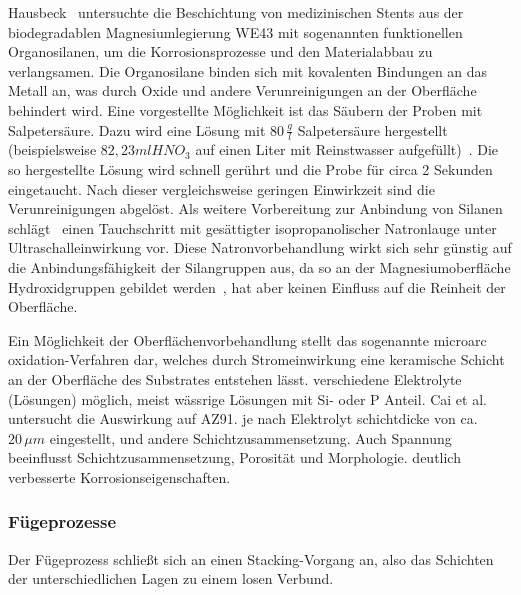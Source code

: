 Hausbeck~\cite{Hausbeck2012} untersuchte die Beschichtung von medizinischen Stents aus der biodegradablen Magnesiumlegierung WE43 mit sogenannten funktionellen Organosilanen, um die Korrosionsprozesse und den Materialabbau zu verlangsamen.
Die Organosilane binden sich mit kovalenten Bindungen an das Metall an, was durch Oxide und andere Verunreinigungen an der Oberfläche behindert wird.
Eine vorgestellte Möglichkeit ist das Säubern der Proben mit Salpetersäure.
Dazu wird eine Lösung mit $80\, \frac{g}{l}$ Salpetersäure hergestellt (beispielsweise $82,23 ml HNO_3$ auf einen Liter mit Reinstwasser aufgefüllt)~.
Die so hergestellte Lösung wird schnell gerührt und die Probe für circa 2 Sekunden eingetaucht.
Nach dieser vergleichsweise geringen Einwirkzeit sind die Verunreinigungen abgelöst.
Als weitere Vorbereitung zur Anbindung von Silanen schlägt~\cite{Hausbeck2012} einen Tauchschritt mit gesättigter isopropanolischer Natronlauge unter Ultraschalleinwirkung vor.
Diese Natronvorbehandlung wirkt sich sehr günstig auf die Anbindungsfähigkeit der Silangruppen aus, da so an der Magnesiumoberfläche Hydroxidgruppen gebildet werden~\cite{Hausbeck2012,Goubaidoulline2004}, hat aber keinen Einfluss auf die Reinheit der Oberfläche.

Ein Möglichkeit der Oberflächenvorbehandlung stellt das sogenannte microarc oxidation-Verfahren dar, welches durch Stromeinwirkung eine keramische Schicht an der Oberfläche des Substrates entstehen lässt.
verschiedene Elektrolyte (Lösungen) möglich, meist wässrige Lösungen mit Si- oder P Anteil.
Cai et al.~\cite{Cai2006} untersucht die Auswirkung auf AZ91.
je nach Elektrolyt schichtdicke von ca. $20 \, \mu m$ eingestellt, und andere Schichtzusammensetzung.
Auch Spannung beeinflusst Schichtzusammensetzung, Porosität und Morphologie.
deutlich verbesserte Korrosionseigenschaften.

\subsubsection{Fügeprozesse}

Der Fügeprozess schließt sich an einen Stacking-Vorgang an, also das Schichten der unterschiedlichen Lagen zu einem losen Verbund.

